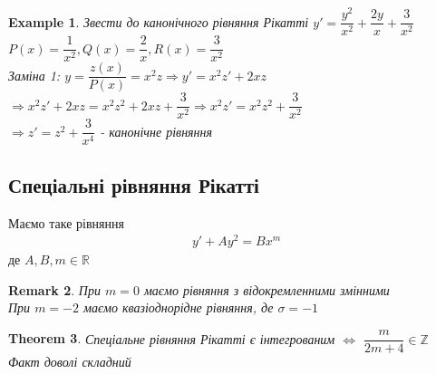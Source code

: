 \documentclass[a4paper, 10pt]{article}
\theoremstyle{theoremdd}
\newtheorem{theorem}{Theorem}[subsection]
\theoremstyle{theoremdd}
\theoremstyle{theoremdd}
\theoremstyle{theoremdd}
\newtheorem{example}[theorem]{Example}
\theoremstyle{theoremdd}
\theoremstyle{theoremdd}
\newtheorem{remark}[theorem]{Remark}
\theoremstyle{theoremdd}
\theoremstyle{theoremdd}
\begin{document}
\begin{example}
 Звести до канонічного рівняння Рікатті $y' = \dfrac{y^2}{x^2} + \dfrac{2y}{x} + \dfrac{3}{x^2}$\\
$P(x) = \dfrac{1}{x^2}, Q(x) = \dfrac{2}{x}, R(x) = \dfrac{3}{x^2}$\\
Заміна 1: $y = \dfrac{z(x)}{P(x)} = x^2 z \Rightarrow y' = x^2 z' + 2xz$\\
$\Rightarrow x^2 z' + 2xz = x^2 z^2 + 2xz + \dfrac{3}{x^2} \Rightarrow x^2z' = x^2z^2 + \dfrac{3}{x^2}$\\
$\Rightarrow z' = z^2 + \dfrac{3}{x^4}$ - канонічне рівняння
\end{example}

\subsection{Спеціальні рівняння Рікатті}
Маємо таке рівняння
\begin{align*}
y' + Ay^2 = Bx^m
\end{align*}
де $A,B, m \in \mathbb{R}$

\begin{remark}
 При $m = 0$ маємо рівняння з відокремленними змінними\\
При $m = -2$ маємо квазіоднорідне рівняння, де $\sigma = -1$
\end{remark}

\begin{theorem} 
Спеціальне рівняння Рікатті є інтегрованим $\iff$ $\dfrac{m}{2m+4} \in \mathbb{Z}$\\
\textit{Факт доволі складний}
\end{theorem}
\end{document}
